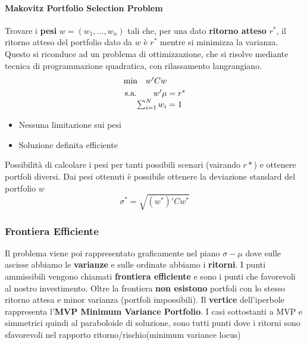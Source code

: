 \documentclass[12pt]{article}
\begin{document}
\paragraph{Makovitz Portfolio Selection Problem} Trovare i \textbf{pesi} $w=(w_1,\dots,w_n)$ tali che, per una dato \textbf{ritorno atteso} $r^*$, il ritorno atteso del portfolio dato da $w$ è $r^*$ mentre si minimizza la varianza. Questo si riconduce ad un problema di ottimizzazione, che si risolve mediante tecnica di programmazione quadratica, con rilassamento langrangiano.
\[
    \begin{array}{r@{}r@{}r@{}l}
        \text{min} \quad w'Cw                        \\[\jot]
        \text{s.a.}\qquad w'\mu & {} & {} & {} = r^* \\
        \sum_{i=1}^Nw_i         &    & {} & {} = 1   \\
    \end{array}
\]
\begin{itemize}
    \item Nessuna limitazione sui pesi
    \item Soluzione definita efficiente
\end{itemize}
Possibilità di calcolare i pesi per tanti possibili scenari (vairando $r*$) e ottenere portfoli diversi. Dai pesi ottenuti è possibile ottenere la deviazione standard del portfolio $w$
$$\sigma^*=\sqrt{(w^*)'Cw^*}$$
\subsubsection{Frontiera Efficiente}
Il problema viene poi rappresentato graficamente nel piano $\sigma-\mu$ dove sulle ascisse abbiamo le \textbf{varianze} e sulle ordinate abbiamo i \textbf{ritorni}. I punti ammissibili vengono chiamati \textbf{frontiera efficiente} e sono i punti che favorevoli al nostro investimento. Oltre la frontiera \textbf{non esistono} portfoli con lo stesso ritorno attesa e minor varianza (portfoli impossibili). Il \textbf{vertice} dell'iperbole rappresenta l'\textbf{MVP Minimum Variance Portfolio}. I casi sottostanti a MVP e simmetrici quindi al paraboloide di soluzione, sono tutti punti dove i ritorni sono sfavorevoli nel rapporto ritorno/rischio(minimum variance locus)
\end{document}
